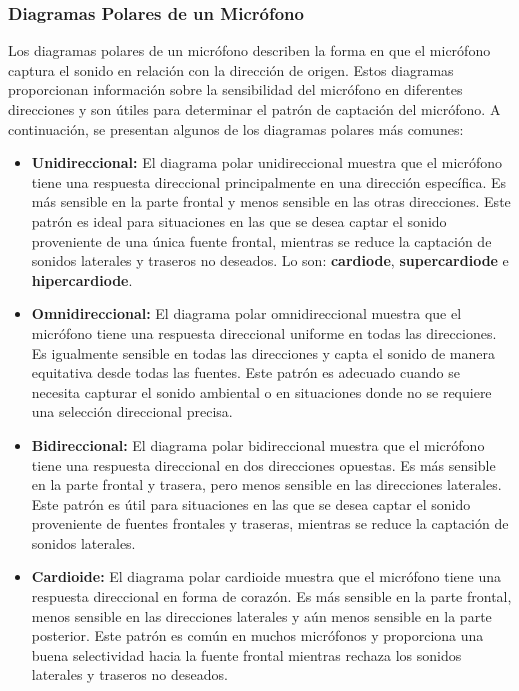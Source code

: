 \documentclass[
	12pt, %
	fleqn, %
	a4paper, %
	oneside, %
]{LegrandOrangeBook}
\begin{document}
\subsubsection*{Diagramas Polares de un Micrófono}
Los diagramas polares de un micrófono describen la forma en que el micrófono captura el sonido en relación con la dirección de origen. Estos diagramas proporcionan información sobre la sensibilidad del micrófono en diferentes direcciones y son útiles para determinar el patrón de captación del micrófono. A continuación, se presentan algunos de los diagramas polares más comunes:
\begin{itemize}
\item \textbf{Unidireccional:} El diagrama polar unidireccional muestra que el micrófono tiene una respuesta direccional principalmente en una dirección específica. Es más sensible en la parte frontal y menos sensible en las otras direcciones. Este patrón es ideal para situaciones en las que se desea captar el sonido proveniente de una única fuente frontal, mientras se reduce la captación de sonidos laterales y traseros no deseados. Lo son: \textbf{cardiode}, \textbf{supercardiode} e \textbf{hipercardiode}.

\item \textbf{Omnidireccional:} El diagrama polar omnidireccional muestra que el micrófono tiene una respuesta direccional uniforme en todas las direcciones. Es igualmente sensible en todas las direcciones y capta el sonido de manera equitativa desde todas las fuentes. Este patrón es adecuado cuando se necesita capturar el sonido ambiental o en situaciones donde no se requiere una selección direccional precisa.

\item \textbf{Bidireccional:} El diagrama polar bidireccional muestra que el micrófono tiene una respuesta direccional en dos direcciones opuestas. Es más sensible en la parte frontal y trasera, pero menos sensible en las direcciones laterales. Este patrón es útil para situaciones en las que se desea captar el sonido proveniente de fuentes frontales y traseras, mientras se reduce la captación de sonidos laterales.

\item \textbf{Cardioide:} El diagrama polar cardioide muestra que el micrófono tiene una respuesta direccional en forma de corazón. Es más sensible en la parte frontal, menos sensible en las direcciones laterales y aún menos sensible en la parte posterior. Este patrón es común en muchos micrófonos y proporciona una buena selectividad hacia la fuente frontal mientras rechaza los sonidos laterales y traseros no deseados.
\end{itemize}
\end{document}
